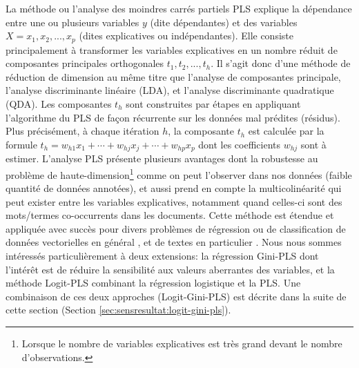 La méthode ou l'analyse des moindres carrés partiels PLS  \citep{wold1966pls} explique la dépendance entre une ou plusieurs variables $y$ (dite dépendantes) et des variables $X=x_1,x_2,...,x_p$ (dites explicatives ou indépendantes). Elle consiste principalement à transformer les variables explicatives en un nombre réduit de composantes principales orthogonales $t_1, t_2, ..., t_h$. Il s'agit donc d'une méthode de réduction de dimension au même titre que l'analyse de composantes principale, l'analyse discriminante linéaire (LDA), et l'analyse discriminante quadratique (QDA). Les composantes $t_h$ sont construites par étapes en appliquant l'algorithme du PLS de façon récurrente sur les données mal prédites (résidus). Plus précisément, à chaque itération $h$, la composante $t_h$ est calculée par la formule $t_h = w_{h1} x_1 + \cdots + w_{hj} x_j + \cdots + w_{hp} x_p$ dont les coefficients $w_{hj}$ sont à estimer. L'analyse PLS présente plusieurs avantages \citep{lacroux2011avantagesPLS} dont la robustesse au problème de haute-dimension\footnote{Lorsque le nombre de variables explicatives est très grand devant le nombre d'observations.} comme on peut l'observer dans nos données (faible quantité de données annotées), et aussi prend en compte la multicolinéarité qui peut exister entre les variables explicatives, notamment quand celles-ci sont des mots/termes co-occurrents dans les documents. Cette méthode est étendue et appliquée avec succès pour divers problèmes de régression \citep{lacroux2011avantagesPLS}
 ou de  classification de données vectorielles en général \citep{liu2007pls4classif,durif2017sparsePLSandLogit, bazzoli2018classificationwithLS-PLS}, et de textes en particulier \citep{zeng2007textclassPLS}.
Nous nous sommes intéressés particulièrement à deux extensions: la régression Gini-PLS \citep{mussard2018ginipls} dont l'intérêt est de réduire la sensibilité aux valeurs aberrantes des variables, et la méthode Logit-PLS \citep{tenenhaus2005logitpls} combinant la régression logistique et la PLS. Une combinaison de ces deux approches (Logit-Gini-PLS) est décrite dans la suite de cette section (Section \ref{sec:sensresultat:logit-gini-pls}).


